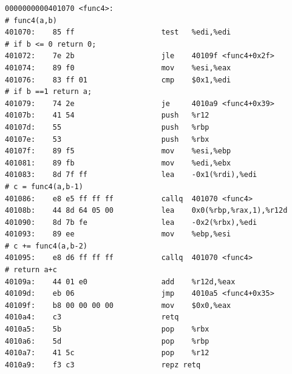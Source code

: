 \begin{verbatim}
0000000000401070 <func4>:
# func4(a,b)
401070:    85 ff                    test   %edi,%edi
# if b <= 0 return 0;
401072:    7e 2b                    jle    40109f <func4+0x2f>
401074:    89 f0                    mov    %esi,%eax
401076:    83 ff 01                 cmp    $0x1,%edi
# if b ==1 return a;
401079:    74 2e                    je     4010a9 <func4+0x39>
40107b:    41 54                    push   %r12
40107d:    55                       push   %rbp
40107e:    53                       push   %rbx
40107f:    89 f5                    mov    %esi,%ebp
401081:    89 fb                    mov    %edi,%ebx
401083:    8d 7f ff                 lea    -0x1(%rdi),%edi
# c = func4(a,b-1)
401086:    e8 e5 ff ff ff           callq  401070 <func4>
40108b:    44 8d 64 05 00           lea    0x0(%rbp,%rax,1),%r12d
401090:    8d 7b fe                 lea    -0x2(%rbx),%edi
401093:    89 ee                    mov    %ebp,%esi
# c += func4(a,b-2)
401095:    e8 d6 ff ff ff           callq  401070 <func4>
# return a+c
40109a:    44 01 e0                 add    %r12d,%eax
40109d:    eb 06                    jmp    4010a5 <func4+0x35>
40109f:    b8 00 00 00 00           mov    $0x0,%eax
4010a4:    c3                       retq   
4010a5:    5b                       pop    %rbx
4010a6:    5d                       pop    %rbp
4010a7:    41 5c                    pop    %r12
4010a9:    f3 c3                    repz retq 


\end{verbatim}
